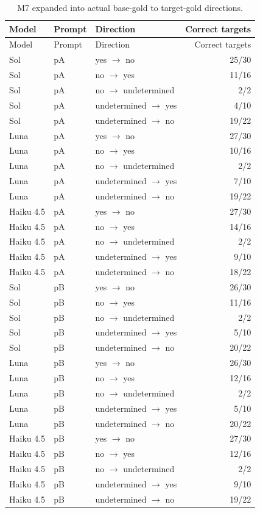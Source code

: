 \begingroup\small\setlength{\tabcolsep}{4pt}
\begin{longtable}{lllr}
\caption{M7 expanded into actual base-gold to target-gold directions.}\\
\toprule
Model & Prompt & Direction & Correct targets \\
\midrule\endfirsthead
\toprule
Model & Prompt & Direction & Correct targets \\
\midrule\endhead
\bottomrule\endfoot
Sol & pA & yes $\to$ no & 25/30 \\
Sol & pA & no $\to$ yes & 11/16 \\
Sol & pA & no $\to$ undetermined & 2/2 \\
Sol & pA & undetermined $\to$ yes & 4/10 \\
Sol & pA & undetermined $\to$ no & 19/22 \\
Luna & pA & yes $\to$ no & 27/30 \\
Luna & pA & no $\to$ yes & 10/16 \\
Luna & pA & no $\to$ undetermined & 2/2 \\
Luna & pA & undetermined $\to$ yes & 7/10 \\
Luna & pA & undetermined $\to$ no & 19/22 \\
Haiku 4.5 & pA & yes $\to$ no & 27/30 \\
Haiku 4.5 & pA & no $\to$ yes & 14/16 \\
Haiku 4.5 & pA & no $\to$ undetermined & 2/2 \\
Haiku 4.5 & pA & undetermined $\to$ yes & 9/10 \\
Haiku 4.5 & pA & undetermined $\to$ no & 18/22 \\
Sol & pB & yes $\to$ no & 26/30 \\
Sol & pB & no $\to$ yes & 11/16 \\
Sol & pB & no $\to$ undetermined & 2/2 \\
Sol & pB & undetermined $\to$ yes & 5/10 \\
Sol & pB & undetermined $\to$ no & 20/22 \\
Luna & pB & yes $\to$ no & 26/30 \\
Luna & pB & no $\to$ yes & 12/16 \\
Luna & pB & no $\to$ undetermined & 2/2 \\
Luna & pB & undetermined $\to$ yes & 5/10 \\
Luna & pB & undetermined $\to$ no & 20/22 \\
Haiku 4.5 & pB & yes $\to$ no & 27/30 \\
Haiku 4.5 & pB & no $\to$ yes & 12/16 \\
Haiku 4.5 & pB & no $\to$ undetermined & 2/2 \\
Haiku 4.5 & pB & undetermined $\to$ yes & 9/10 \\
Haiku 4.5 & pB & undetermined $\to$ no & 19/22 \\
\end{longtable}\endgroup



